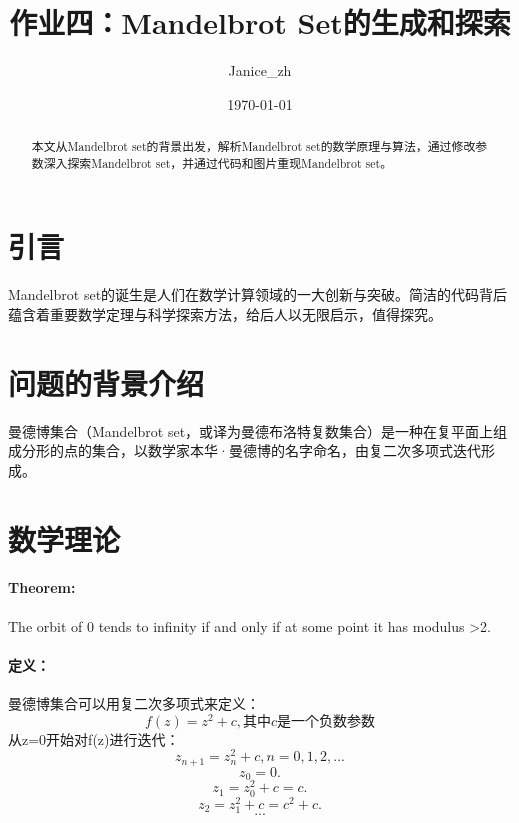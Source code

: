 \documentclass{article}
\title{作业四：Mandelbrot Set的生成和探索}
\author{Janice\_zh}
\date{\today}
\begin{document}
   	\maketitle   %
   	\renewcommand{\contentsname}{目录}
   	\tableofcontents  %
   	
   	\renewcommand{\abstractname}{摘要}
   	\begin{abstract}
   		本文从Mandelbrot set的背景出发，解析Mandelbrot set的数学原理与算法，通过修改参数深入探索Mandelbrot set，并通过代码和图片重现Mandelbrot set。
   	\end{abstract}
   	\section{引言}
   	Mandelbrot set的诞生是人们在数学计算领域的一大创新与突破。简洁的代码背后蕴含着重要数学定理与科学探索方法，给后人以无限启示，值得探究。
   	\section{问题的背景介绍}
   	曼德博集合（Mandelbrot set，或译为曼德布洛特复数集合）是一种在复平面上组成分形的点的集合，以数学家本华·曼德博的名字命名，由复二次多项式迭代形成。
   	\section{数学理论}
   	\paragraph{Theorem:}The orbit of 0 tends to infinity if and only if at some point it has modulus >2. \cite{R}
   	
   	\paragraph{定义：}曼德博集合可以用复二次多项式来定义： 
   	\begin{equation}
   	f(z)=z^2+c,其中c是一个负数参数
   	\end{equation}
   	从z=0开始对f(z)进行迭代：
   	\begin{equation}
   	z_{n+1}=z^2_n+c,n=0,1,2,...
   	\end{equation}
   	\begin{equation}
   	z_0=0.\nonumber
   	\end{equation}
   	\begin{equation}
   	z_1=z^2_0+c=c.\nonumber
   	\end{equation}
   	\begin{equation}
   	z_2=z^2_1+c=c^2+c.\nonumber
   	\end{equation}
   	\begin{equation}
   	...\nonumber
   	\end{equation}
\end{document}
